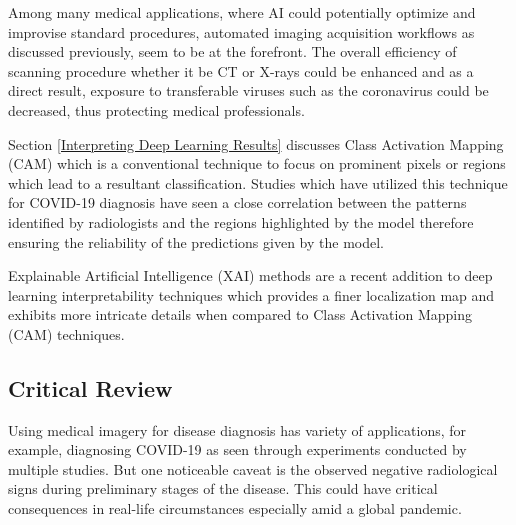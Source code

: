 Among many medical applications, where AI could potentially 
optimize and improvise standard procedures, automated 
imaging acquisition workflows as discussed previously, seem to be at the forefront. The overall efficiency of scanning procedure 
whether it be CT or X-rays could be enhanced and as a direct result, 
exposure to transferable viruses such as the coronavirus could be 
decreased, thus protecting medical professionals. 


Section \ref{Interpreting Deep Learning Results} discusses Class Activation Mapping (CAM) which is a conventional 
technique to focus on prominent pixels or regions which lead to a 
resultant classification. Studies which have utilized this technique 
for COVID-19 diagnosis have seen a close correlation between the patterns 
identified by radiologists and the regions highlighted by the model therefore 
ensuring the reliability of the predictions given by the model.

Explainable Artificial Intelligence (XAI) methods \cite{ADD+2020, FSA+2020} are a recent addition 
to deep learning interpretability techniques which provides a finer localization 
map and exhibits more intricate details when compared to 
Class Activation Mapping (CAM) techniques.
\subsection*{Critical Review}

Using medical imagery for disease diagnosis has variety of applications, for example, 
diagnosing COVID-19 as seen through experiments conducted by multiple studies. But one noticeable caveat is the observed negative radiological signs during preliminary stages of the disease. This could have critical consequences in real-life circumstances especially amid a global pandemic.


